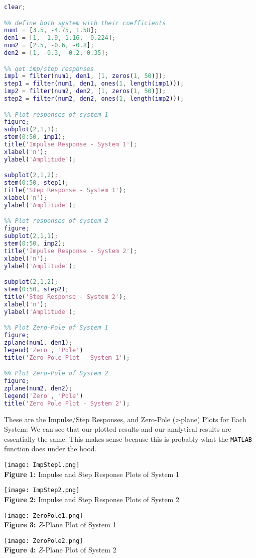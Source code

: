 \documentclass[]{report}
\newcommand{\matlab}{\texttt{MATLAB} }
\begin{document}
\begin{lstlisting}[language=Matlab, frame=single]
%% ensure clear data
clear;

%% define both system with their coefficients
num1 = [3.5, -4.75, 1.58];
den1 = [1, -1.9, 1.16, -0.224];
num2 = [2.5, -0.6, -0.8];
den2 = [1, -0.3, -0.2, 0.35];

%% get imp/step responses
imp1 = filter(num1, den1, [1, zeros(1, 50)]);
step1 = filter(num1, den1, ones(1, length(imp1)));
imp2 = filter(num2, den2, [1, zeros(1, 50)]);
step2 = filter(num2, den2, ones(1, length(imp2)));

%% Plot responses of system 1
figure;
subplot(2,1,1);
stem(0:50, imp1);
title('Impulse Response - System 1');
xlabel('n');
ylabel('Amplitude');

subplot(2,1,2);
stem(0:50, step1);
title('Step Response - System 1');
xlabel('n');
ylabel('Amplitude');

%% Plot responses of system 2
figure;
subplot(2,1,1);
stem(0:50, imp2);
title('Impulse Response - System 2');
xlabel('n');
ylabel('Amplitude');

subplot(2,1,2);
stem(0:50, step2);
title('Step Response - System 2');
xlabel('n');
ylabel('Amplitude');

%% Plot Zero-Pole of System 1
figure;
zplane(num1, den1);
legend('Zero', 'Pole')
title('Zero Pole Plot - System 1');

%% Plot Zero-Pole of System 2
figure;
zplane(num2, den2);
legend('Zero', 'Pole')
title('Zero Pole Plot - System 2');

\end{lstlisting}

These are the Impulse/Step Responses, and Zero-Pole ($z$-plane) Plots for Each System: We can see that our plotted results and our analytical results are essentially the same. This makes sense because this is probably what the \matlab function does under the hood.

\begin{center}
	\centering
	\texttt{[image: ImpStep1.png]} \\
	\textbf{Figure 1:} Impulse and Step Response Plots of System 1
\end{center}

\begin{center}
	\centering
	\texttt{[image: ImpStep2.png]} \\
	\textbf{Figure 2:} Impulse and Step Response Plots of System 2
\end{center}

\begin{center}
	\centering
	\texttt{[image: ZeroPole1.png]} \\
	\textbf{Figure 3:} $Z$-Plane Plot of System 1
\end{center}

\begin{center}
	\centering
	\texttt{[image: ZeroPole2.png]} \\
	\textbf{Figure 4:} $Z$-Plane Plot of System 2
\end{center}
\end{document}
